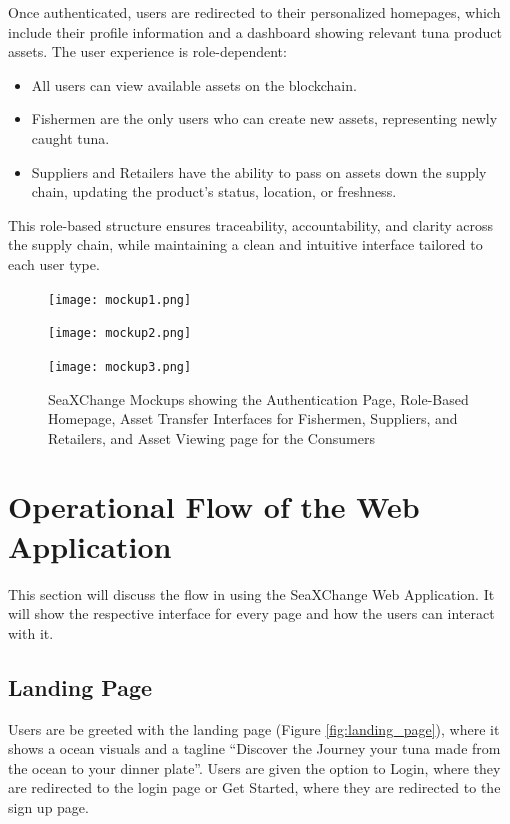 Once authenticated, users are redirected to their personalized homepages, which include their profile information and a dashboard showing relevant tuna product assets. The user experience is role-dependent:
\begin{itemize}
	\item All users can view available assets on the blockchain.
	\item Fishermen are the only users who can create new assets, representing newly caught tuna.
	\item Suppliers and Retailers have the ability to pass on assets down the supply chain, updating the product's status, location, or freshness.
\end{itemize}
This role-based structure ensures traceability, accountability, and clarity across the supply chain, while maintaining a clean and intuitive interface tailored to each user type.
\begin{figure}[H]
	\centering
	\texttt{[image: mockup1.png]}
	
	\vspace{20pt} %
	
	\texttt{[image: mockup2.png]}
	\label{fig:initial_mockups}
\end{figure}

\clearpage %


\begin{figure}[H]
	\centering
	\texttt{[image: mockup3.png]}
	\caption{SeaXChange Mockups showing the Authentication Page, Role-Based Homepage, Asset Transfer Interfaces for Fishermen, Suppliers, and Retailers, and Asset Viewing page for the Consumers}
	\label{fig:eight_step}
\end{figure}


\section{Operational Flow of the Web Application}
This section will discuss the flow in using the SeaXChange Web Application. It will show the respective interface for every page and how the users can interact with it. 

\subsection{Landing Page}
Users are be greeted with the landing page (Figure \ref{fig:landing_page}), where it shows a ocean visuals and a tagline “Discover the Journey your tuna made from the ocean to your dinner plate”. Users are given the option to Login, where they are redirected to the login page or Get Started, where they are redirected to the sign up page. 

